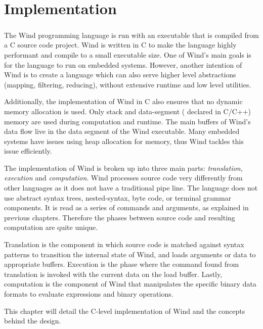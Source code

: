 
\chapter{Implementation}
\newtheorem{theorem}{Theorem}

\paragraph{  } The Wind programming language is run with an executable that is compiled from a C source code project. Wind is written in C to make the language highly performant and compile to a small executable size. One of Wind's main goals is for the language to run on embedded systems. However, another intention of Wind is to create a language which can also serve higher level abstractions (mapping, filtering, reducing), without extensive runtime and low level utilities.
\par Additionally, the implementation of Wind in C also ensures that no dynamic memory allocation is used. Only stack and data-segment ( declared in C/C++) memory are used during computation and runtime. The main buffers of Wind's data flow live in the data segment of the Wind executable. Many embedded systems have issues using heap allocation for memory, thus Wind tackles this issue efficiently.
\par The implementation of Wind is broken up into three main parts: \emph{translation}, \emph{execution} and \emph{computation}. Wind processes source code very differently from other languages as it does not have a traditional pipe line. The language does not use abstract syntax trees, nested-syntax, byte code,  or terminal grammar components. It is read as a series of commands and arguments, as explained in previous chapters. Therefore the phases between source code and resulting computation are quite unique. 
\par Translation is the component in which source code is matched against syntax patterns to transition the internal state of Wind, and loads arguments or data to appropriate buffers. Execution is the phase where the command found from translation is invoked with the current data on the load buffer. Lastly, computation is the component of Wind that manipulates the specific binary data formats to evaluate expressions and binary operations.
\par This chapter will detail the C-level implementation of Wind and the concepts behind the design.

